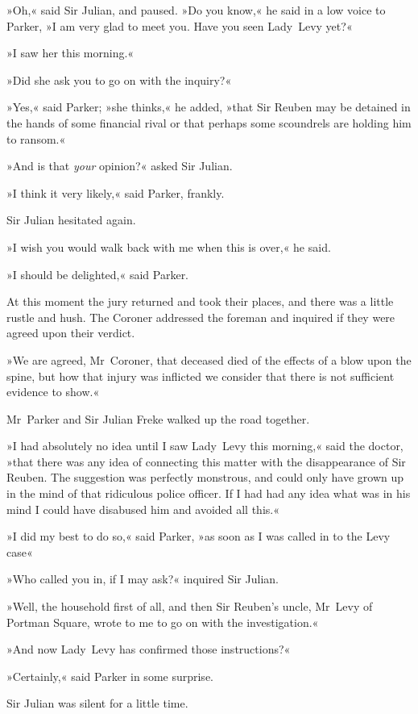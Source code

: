 »Oh,« said Sir Julian, and paused. »Do you know,« he said in a low voice to Parker, »I am very glad to meet you. Have you seen Lady~Levy yet?«

»I saw her this morning.«

»Did she ask you to go on with the inquiry?«

»Yes,« said Parker; »she thinks,« he added, »that Sir Reuben may be detained in the hands of some financial rival or that perhaps some scoundrels are holding him to ransom.«

»And is that \textit{your} opinion?« asked Sir Julian.

»I think it very likely,« said Parker, frankly.

Sir Julian hesitated again.

»I wish you would walk back with me when this is over,« he said.

»I should be delighted,« said Parker.

At this moment the jury returned and took their places, and there was a little rustle and hush. The Coroner addressed the foreman and inquired if they were agreed upon their verdict.

»We are agreed, Mr~Coroner, that deceased died of the effects of a blow upon the spine, but how that injury was inflicted we consider that there is not sufficient evidence to show.«

Mr~Parker and Sir Julian Freke walked up the road together.

»I had absolutely no idea until I saw Lady~Levy this morning,« said the doctor, »that there was any idea of connecting this matter with the disappearance of Sir Reuben. The suggestion was perfectly monstrous, and could only have grown up in the mind of that ridiculous police officer. If I had had any idea what was in his mind I could have disabused him and avoided all this.«

»I did my best to do so,« said Parker, »as soon as I was called in to the Levy case\longdash«

»Who called you in, if I may ask?« inquired Sir Julian.

»Well, the household first of all, and then Sir Reuben's uncle, Mr~Levy of Portman Square, wrote to me to go on with the investigation.«

»And now Lady~Levy has confirmed those instructions?«

»Certainly,« said Parker in some surprise.

Sir Julian was silent for a little time.

